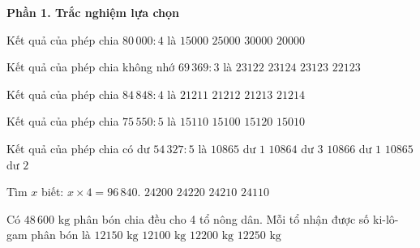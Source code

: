 \textbf{Phần 1. Trắc nghiệm lựa chọn}

\begin{ex} %
Kết quả của phép chia $80\,000 : 4$ là
\choice
{$15000$}
{$25000$}
{$30000$}
{\True $20000$}
\end{ex}

\begin{ex} %
Kết quả của phép chia không nhớ $69\,369 : 3$ là
\choice
{$23122$}
{$23124$}
{\True $23123$}
{$22123$}
\end{ex}

\begin{ex} %
Kết quả của phép chia $84\,848 : 4$ là
\choice
{$21211$}
{\True $21212$}
{$21213$}
{$21214$}
\end{ex}

\begin{ex} %
Kết quả của phép chia $75\,550 : 5$ là
\choice
{\True $15110$}
{$15100$}
{$15120$}
{$15010$}
\end{ex}

\begin{ex} %
Kết quả của phép chia có dư $54\,327 : 5$ là
\choice
{$10865$ dư $1$}
{$10864$ dư $3$}
{$10866$ dư $1$}
{\True $10865$ dư $2$}
\end{ex}

\begin{ex} %
Tìm $x$ biết: $x \times 4 = 96\,840$.
\choice
{$24200$}
{$24220$}
{\True $24210$}
{$24110$}
\end{ex}

\begin{ex} %
Có $48\,600\text{ kg}$ phân bón chia đều cho 4 tổ nông dân. Mỗi tổ nhận được số ki-lô-gam phân bón là
\choice
{\True $12150\text{ kg}$}
{$12100\text{ kg}$}
{$12200\text{ kg}$}
{$12250\text{ kg}$}
\end{ex}

